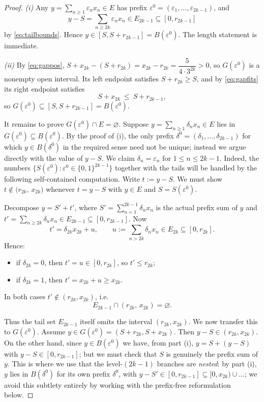 \documentclass{amsart}
\theoremstyle{definition}
\begin{document}
\begin{proof}
\emph{(i)} Any $y=\sum_{n\ge1}\varepsilon_n x_n\in E$ has prefix
$\varepsilon^{0}=(\varepsilon_1,\dots,\varepsilon_{2k-1})$, and
$$y-S=\sum_{n\ge 2k}\varepsilon_n x_n\in E_{2k-1}\subseteq[0,r_{2k-1}]$$
by \eqref{eq:tailbounds}. Hence $y\in[S,S+r_{2k-1}]=B(\varepsilon^{0})$. The length statement is
immediate.

\emph{(ii)} By \eqref{eq:gappos}, $S+x_{2k}-(S+r_{2k})=x_{2k}-r_{2k}=\dfrac{5}{4\cdot 3^{2k}}>0$,
so $G(\varepsilon^{0})$ is a nonempty open interval. Its left endpoint satisfies
$S+r_{2k}\ge S$, and by \eqref{eq:gapfits} its right endpoint satisfies
$$S+x_{2k}\ \le\ S+r_{2k-1},$$
so $G(\varepsilon^{0})\subseteq[S,S+r_{2k-1}]=B(\varepsilon^{0})$.

It remains to prove $G(\varepsilon^{0})\cap E=\varnothing$. Suppose
$y=\sum_{n\ge1}\delta_n x_n\in E$ lies in $G(\varepsilon^{0})\subseteq B(\varepsilon^{0})$. By the proof of
(i), the only prefix $\delta^{0}=(\delta_1,\dots,\delta_{2k-1})$ for which $y\in B(\delta^{0})$ in
the required sense need not be unique; instead we argue directly with the value of $y-S$.
We claim $\delta_n=\varepsilon_n$ for $1\le n\le 2k-1$. Indeed, the numbers
$\{S(\varepsilon^{0}):\varepsilon^{0}\in\{0,1\}^{2k-1}\}$ together with the tails will be handled by the
following self-contained computation. Write $t:=y-S$. We must show
$t\notin\big(r_{2k},\,x_{2k}\big)$ whenever $t=y-S$ with $y\in E$ and $S=S(\varepsilon^{0})$.

Decompose $y=S'+t'$, where $S'=\sum_{n=1}^{2k-1}\delta_n x_n$ is the actual prefix sum of $y$
and $t'=\sum_{n\ge 2k}\delta_n x_n\in E_{2k-1}\subseteq[0,r_{2k-1}]$. Now
$$t'=\delta_{2k}x_{2k}+u,\qquad u:=\sum_{n>2k}\delta_n x_n\in E_{2k}\subseteq[0,r_{2k}] .$$
Hence:
\begin{itemize}
\item if $\delta_{2k}=0$, then $t'=u\in[0,r_{2k}]$, so $t'\le r_{2k}$;
\item if $\delta_{2k}=1$, then $t'=x_{2k}+u\ge x_{2k}$.
\end{itemize}
In both cases $t'\notin(r_{2k},x_{2k})$, i.e.
\begin{equation}\label{eq:tailgap}
E_{2k-1}\cap(r_{2k},\,x_{2k})=\varnothing .
\end{equation}

Thus the tail set $E_{2k-1}$ itself omits the interval $(r_{2k},x_{2k})$. We now transfer this
to $G(\varepsilon^{0})$. Assume $y\in G(\varepsilon^{0})=(S+r_{2k},S+x_{2k})$. Then
$y-S\in(r_{2k},x_{2k})$. On the other hand, since $y\in B(\varepsilon^{0})$ we have, from part (i),
$y=S+(y-S)$ with $y-S\in[0,r_{2k-1}]$; but we must check that $S$ is genuinely the prefix sum
of $y$. This is where we use that the level-$(2k-1)$ branches are \emph{nested}: by part (i),
$y$ lies in $B(\delta^{0})$ for its own prefix $\delta^{0}$, with
$y-S'\in[0,r_{2k-1}]\subseteq[0,x_{2k})\cup\dots$; we avoid this subtlety entirely by working
with the prefix-free reformulation below.
\end{proof}
\end{document}
